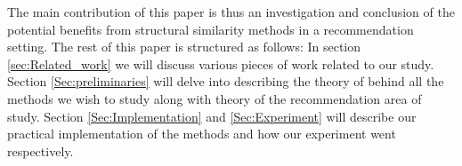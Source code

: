   The main contribution of this paper is thus an investigation and conclusion of the potential benefits from structural similarity methods in a recommendation setting. The rest of this paper is structured as follows:
  In section \ref{sec:Related_work} we will discuss various pieces of work related to our study. Section \ref{Sec:preliminaries} will delve into describing the theory of behind all the methods we wish to study along with theory of the recommendation area of study. Section \ref{Sec:Implementation} and \ref{Sec:Experiment} will describe our practical implementation of the methods and how our experiment went respectively. 

